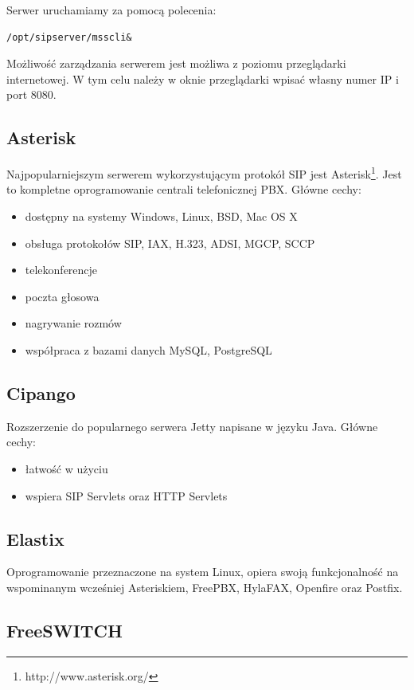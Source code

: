 Serwer uruchamiamy za pomocą polecenia:
\begin{lstlisting}
/opt/sipserver/msscli&
\end{lstlisting}
Możliwość zarządzania serwerem jest możliwa z poziomu przeglądarki internetowej. W tym celu należy w oknie przeglądarki wpisać własny numer IP i port 8080. 


\subsection{Asterisk}
Najpopularniejszym serwerem wykorzystującym protokół SIP jest Asterisk\footnote{http://www.asterisk.org/}. Jest to kompletne oprogramowanie centrali telefonicznej PBX.
Główne cechy:
\begin{itemize}
	\item dostępny na systemy Windows, Linux, BSD, Mac OS X
	\item obsługa protokołów SIP, IAX, H.323, ADSI, MGCP, SCCP
	\item telekonferencje
	\item poczta głosowa
	\item nagrywanie rozmów
	\item współpraca z bazami danych MySQL, PostgreSQL
\end{itemize}   


\subsection{Cipango}

Rozszerzenie  do popularnego serwera Jetty napisane w języku Java. 
Główne cechy:
\begin{itemize}
	\item łatwość w użyciu
	\item wspiera SIP Servlets oraz HTTP Servlets
\end{itemize}

\subsection{Elastix}

Oprogramowanie przeznaczone na system Linux, opiera swoją funkcjonalność na wspominanym wcześniej Asteriskiem, FreePBX, HylaFAX, Openfire oraz Postfix.

\subsection{FreeSWITCH}

